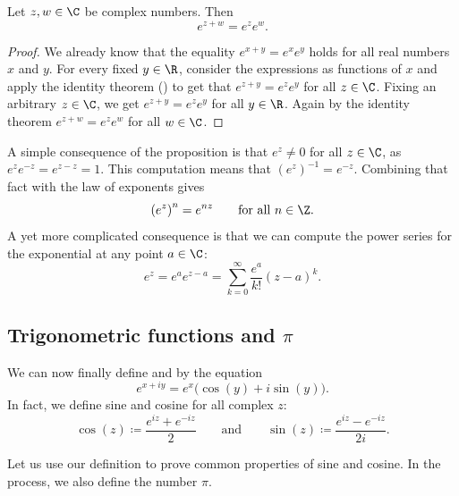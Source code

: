 \begin{prop}
Let $z,w \in \C$ be complex numbers.  Then
\begin{equation*}
e^{z+w} = e^z e^w.
\end{equation*}
\end{prop}

\begin{proof}
We already know that
the equality
$e^{x+y} = e^x e^y$ holds for all
real numbers $x$ and $y$.
For every fixed $y \in \R$, consider the expressions as
functions of $x$ and apply the identity theorem
() to get that
$e^{z+y} = e^ze^y$ for all $z \in \C$.  Fixing an arbitrary $z \in \C$,
we get
$e^{z+y} = e^ze^y$ for all $y \in \R$.  Again by the identity theorem 
$e^{z+w} = e^z e^w$
for all $w \in \C$.
\end{proof}

A simple consequence of the proposition is that $e^z \neq 0$ for all $z \in \C$,
as $e^z e^{-z} = e^{z-z} = 1$.
This computation means that ${(e^z)}^{-1} = e^{-z}$.
Combining that fact with the law of exponents gives
\begin{equation*}
{(e^z)}^{n} = e^{nz} \qquad \text{for all } n \in \Z.
\end{equation*}
A yet more complicated consequence is that we
can compute the power series for the exponential at any point $a \in
\C$:
\begin{equation*}
e^z = e^a e^{z-a} = \sum_{k=0}^\infty \frac{e^a}{k!} {(z-a)}^k .
\end{equation*}

\subsection{Trigonometric functions and $\pi$}

We can now finally define \emph{} and \emph{}
by the equation
\begin{equation*}
e^{x+iy} = e^x \bigl( \cos(y) + i \sin(y) \bigr) .
\end{equation*}
In fact, we define sine and cosine for all complex $z$:
\begin{equation*}
\cos(z) \coloneqq \frac{e^{iz} + e^{-iz}}{2}
\qquad\text{and}\qquad
\sin(z) \coloneqq \frac{e^{iz} - e^{-iz}}{2i} .
\end{equation*}

Let us use our definition to prove common properties of
sine and cosine.  In the process, we also define the
number $\pi$.

